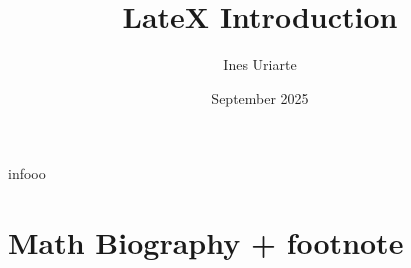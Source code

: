 \documentclass{article}
\title{LateX Introduction}
\author{Ines Uriarte}
\date{September 2025}
\begin{document}
infooo

\maketitle

\section{Math Biography + footnote}
\end{document}
